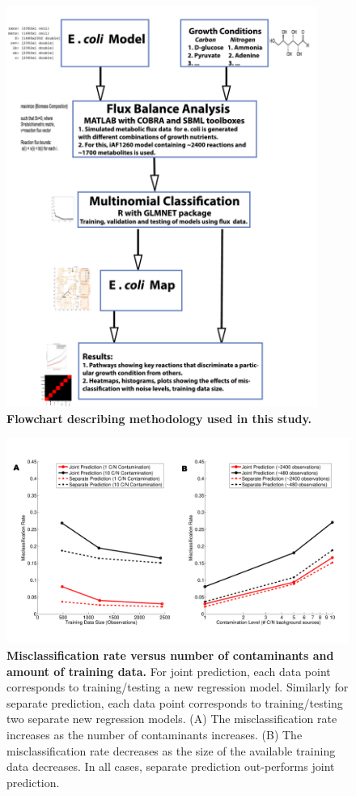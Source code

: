 \documentclass[12pt]{article}
\begin{document}
\begin{figure}[!ht]
\centerline{\includegraphics[width=4in]{Figures/flowchart_new.pdf}}
\caption{\label{fig:flowchart}\textbf{Flowchart describing methodology used in this study.}}
\end{figure}

\clearpage
\begin{figure}[!ht]
\centerline{\includegraphics[width=6in]{Figures/combinedContaminationTrainingdata.pdf}}
\caption{\label{fig:misclassification}\textbf{Misclassification rate versus number of contaminants and amount of training data.} For joint prediction, each data point corresponds to training/testing a new regression model. Similarly for separate prediction, each data point corresponds to training/testing two separate new regression models. (A) The misclassification rate increases as the number of contaminants increases. (B) The misclassification rate decreases as the size of the available training data decreases. In all cases, separate prediction out-performs joint prediction.}
\end{figure}
\end{document}
